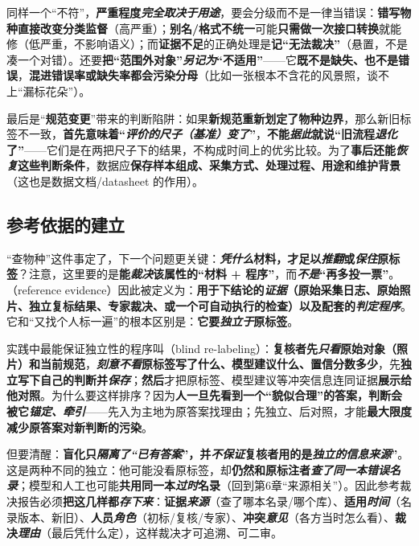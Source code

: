 同样一个“不符”，\textbf{严重程度\emph{完全取决于用途}}，要会分级而不是一律当错误：\textbf{错写物种}\textbf{直接改变分类监督}（高严重）；\textbf{别名/格式不统一}可能\textbf{只需做一次接口转换}就能修（低严重，不影响语义）；而\textbf{证据不足}的正确处理是\textbf{记“无法裁决”}（悬置，不是凑一个对错）。还要\textbf{把“范围外对象”\emph{另记为}“不适用”}——它\textbf{既不是缺失、也不是错误}，\textbf{混进错误率或缺失率都会污染分母}（比如一张根本不含花的风景照，谈不上“漏标花朵”）。

最后是“\textbf{规范变更}”带来的判断陷阱：如果\textbf{新规范重新划定了物种边界}，那么新旧标签不一致，\textbf{首先意味着“\emph{评价的尺子（基准）变了}”}，\textbf{不能\emph{据此}就说“旧流程\emph{退化}了”}——它们是在两把尺子下的结果，不构成时间上的优劣比较。为了\textbf{事后还能\emph{恢复}这些判断条件}，数据应\textbf{保存样本组成、采集方式、处理过程、用途和维护背景}（这也是数据文档/datasheet 的作用）。

\subsection{参考依据的建立}
\label{sec:knowledge-quality-assessment-correction-reference}

“查物种”这件事定了，下一个问题更关键：\textbf{\emph{凭什么}材料，才足以\emph{推翻}或\emph{保住}原标签}？注意，这里要的是\textbf{能\emph{裁决}该属性的“材料 + 程序”}，而\textbf{\emph{不是}“再多投一票”}。（reference evidence）因此被定义为：\textbf{用于下结论的\emph{证据}（原始采集日志、原始照片、独立复标结果、专家裁决、或一个可自动执行的检查）以及配套的\emph{判定程序}}。它和“又找个人标一遍”的根本区别是：\textbf{它要\emph{独立于}原标签}。

实践中最能保证独立性的程序叫（blind re-labeling）：\textbf{复核者先\emph{只看}原始对象（照片）和当前规范}，\textbf{\emph{刻意不看}原标签写了什么、模型建议什么、置信分数多少}，先\textbf{独立写下自己的判断并\emph{保存}}；\textbf{然后}才把原标签、模型建议等冲突信息连同证据\textbf{展示给他对照}。为什么要这样排序？因为\textbf{人一旦先看到一个“貌似合理”的答案，判断会被它\emph{锚定、牵引}}——先入为主地为原答案找理由；先独立、后对照，才能\textbf{最大限度减少原答案对新判断的污染}。

但要清醒：\textbf{盲化只\emph{隔离了“已有答案}”，并\emph{不保证}复核者用的是\emph{独立的信息来源}”}。这是两种不同的独立：他可能没看原标签，却\textbf{仍然和原标注者\emph{查了同一本错误名录}}；模型和人工也可能\textbf{共用同一本\emph{过时}名录}（回到第6章“来源相关”）。因此参考裁决报告必须\textbf{把这几样都\emph{存下来}}：\textbf{证据\emph{来源}}（查了哪本名录/哪个库）、\textbf{适用\emph{时间}}（名录版本、新旧）、\textbf{人员\emph{角色}}（初标/复核/专家）、\textbf{冲突\emph{意见}}（各方当时怎么看）、\textbf{裁决\emph{理由}}（最后凭什么定），这样裁决才可追溯、可二审。

